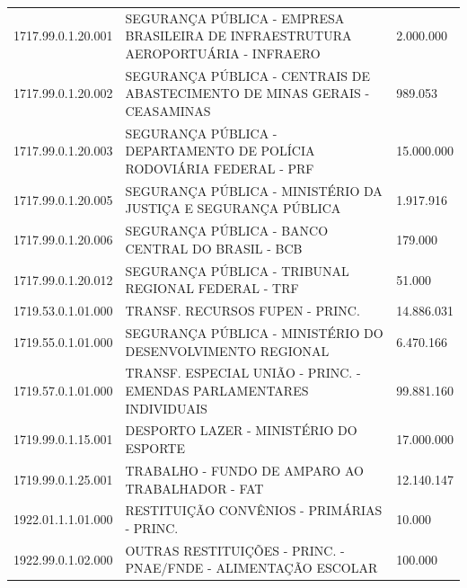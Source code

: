 \documentclass{article}
\begin{document}
\begin{longtable}[c]{m{2cm}|m{13cm}|m{2cm}}
\multicolumn{1}{C{2cm}|}{1717.99.0.1.20.001} & \multicolumn{1}{L{13cm}|}{SEGURANÇA PÚBLICA - EMPRESA BRASILEIRA DE INFRAESTRUTURA AEROPORTUÁRIA - INFRAERO} & \multicolumn{1}{R{2cm}}{2.000.000} \\
\multicolumn{1}{C{2cm}|}{1717.99.0.1.20.002} & \multicolumn{1}{L{13cm}|}{SEGURANÇA PÚBLICA - CENTRAIS DE ABASTECIMENTO DE MINAS GERAIS - CEASAMINAS} & \multicolumn{1}{R{2cm}}{989.053} \\
\multicolumn{1}{C{2cm}|}{1717.99.0.1.20.003} & \multicolumn{1}{L{13cm}|}{SEGURANÇA PÚBLICA - DEPARTAMENTO DE POLÍCIA RODOVIÁRIA FEDERAL - PRF} & \multicolumn{1}{R{2cm}}{15.000.000} \\
\multicolumn{1}{C{2cm}|}{1717.99.0.1.20.005} & \multicolumn{1}{L{13cm}|}{SEGURANÇA PÚBLICA - MINISTÉRIO DA JUSTIÇA E SEGURANÇA PÚBLICA} & \multicolumn{1}{R{2cm}}{1.917.916} \\
\multicolumn{1}{C{2cm}|}{1717.99.0.1.20.006} & \multicolumn{1}{L{13cm}|}{SEGURANÇA PÚBLICA - BANCO CENTRAL DO BRASIL - BCB} & \multicolumn{1}{R{2cm}}{179.000} \\
\multicolumn{1}{C{2cm}|}{1717.99.0.1.20.012} & \multicolumn{1}{L{13cm}|}{SEGURANÇA PÚBLICA - TRIBUNAL REGIONAL FEDERAL - TRF} & \multicolumn{1}{R{2cm}}{51.000} \\
\multicolumn{1}{C{2cm}|}{1719.53.0.1.01.000} & \multicolumn{1}{L{13cm}|}{TRANSF. RECURSOS FUPEN - PRINC.} & \multicolumn{1}{R{2cm}}{14.886.031} \\
\multicolumn{1}{C{2cm}|}{1719.55.0.1.01.000} & \multicolumn{1}{L{13cm}|}{SEGURANÇA PÚBLICA - MINISTÉRIO DO DESENVOLVIMENTO REGIONAL} & \multicolumn{1}{R{2cm}}{6.470.166} \\
\multicolumn{1}{C{2cm}|}{1719.57.0.1.01.000} & \multicolumn{1}{L{13cm}|}{TRANSF. ESPECIAL UNIÃO - PRINC. - EMENDAS PARLAMENTARES INDIVIDUAIS} & \multicolumn{1}{R{2cm}}{99.881.160} \\
\multicolumn{1}{C{2cm}|}{1719.99.0.1.15.001} & \multicolumn{1}{L{13cm}|}{DESPORTO LAZER - MINISTÉRIO DO ESPORTE} & \multicolumn{1}{R{2cm}}{17.000.000} \\
\multicolumn{1}{C{2cm}|}{1719.99.0.1.25.001} & \multicolumn{1}{L{13cm}|}{TRABALHO - FUNDO DE AMPARO AO TRABALHADOR - FAT} & \multicolumn{1}{R{2cm}}{12.140.147} \\
\multicolumn{1}{C{2cm}|}{1922.01.1.1.01.000} & \multicolumn{1}{L{13cm}|}{RESTITUIÇÃO CONVÊNIOS - PRIMÁRIAS - PRINC.} & \multicolumn{1}{R{2cm}}{10.000} \\
\multicolumn{1}{C{2cm}|}{1922.99.0.1.02.000} & \multicolumn{1}{L{13cm}|}{OUTRAS RESTITUIÇÕES - PRINC. - PNAE/FNDE - ALIMENTAÇÃO ESCOLAR} & \multicolumn{1}{R{2cm}}{100.000} \\

\end{longtable}
\end{document}
